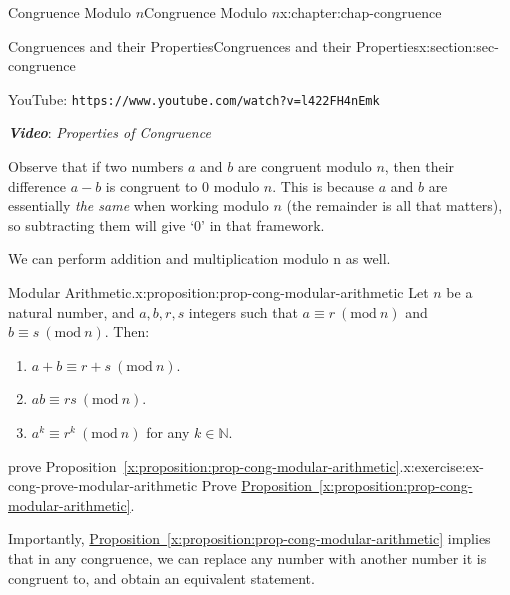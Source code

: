 \documentclass[oneside,10pt,]{book}
\newcommand{\xreffont}{\relax}
\newcommand{\mono}[1]{\texttt{#1}}
\newcommand{\alert}[1]{\textbf{\textit{#1}}}
\numberwithin{equation}{section}
\newlength{\qrsize}
\newlength{\previewwidth}
\newcommand{\Mod}[1]{\ \left(\mathrm{mod}\ #1\right)}
\begin{document}
\begin{chapterptx}{Congruence Modulo \(n\)}{}{Congruence Modulo \(n\)}{}{}{x:chapter:chap-congruence}
\begin{sectionptx}{Congruences and their Properties}{}{Congruences and their Properties}{}{}{x:section:sec-congruence}
\begin{sidebyside}{1}{0}{0}{0}
\begin{sbspanel}{1}
\begin{tcbraster}[raster columns=2, raster column skip=1pt, raster halign=center, raster force size=false, raster left skip=0pt, raster right skip=0pt]
\begin{tcolorbox}[previewstyle, width=\previewwidth]
\end{tcolorbox}%
\begin{tcolorbox}[qrstyle]%
{\hypersetup{urlcolor=black}}%
\end{tcolorbox}%
\begin{tcolorbox}[captionstyle]%
\small YouTube: \mono{https://www.youtube.com/watch?v=l422FH4nEmk}\end{tcolorbox}%
\end{tcbraster}%
\end{sbspanel}%
\end{sidebyside}%
\par
\alert{Video}: \emph{Properties of Congruence}%
\par
Observe that if two numbers \(a\) and \(b\) are congruent modulo \(n\), then their difference \(a-b\) is congruent to 0 modulo \(n\). This is because \(a\) and \(b\) are essentially \emph{the same} when working modulo \(n\) (the remainder is all that matters), so subtracting them will give `0' in that framework.%
\par
We can perform addition and multiplication modulo \textdollar{}n\textdollar{} as well.%
\begin{proposition}{Modular Arithmetic.}{}{x:proposition:prop-cong-modular-arithmetic}%
Let \(n\) be a natural number, and \(a, b, r, s\) integers such that \(a \equiv r \Mod{n}\) and \(b \equiv s \Mod{n}\). Then:%
\begin{enumerate}[label=(\alph*)]
\item{}\(a + b \equiv r + s \Mod{n}\).%
\item{}\(ab \equiv rs \Mod{n}\).%
\item{}\(a^k \equiv r^k \Mod{n}\) for any \(k \in \mathbb{N}\).%
\end{enumerate}
%
\end{proposition}
\begin{inlineexercise}{prove Proposition~{\xreffont\ref*{x:proposition:prop-cong-modular-arithmetic}}.}{x:exercise:ex-cong-prove-modular-arithmetic}%
Prove \hyperref[x:proposition:prop-cong-modular-arithmetic]{Proposition~{\xreffont\ref{x:proposition:prop-cong-modular-arithmetic}}}.%
\end{inlineexercise}%
Importantly, \hyperref[x:proposition:prop-cong-modular-arithmetic]{Proposition~{\xreffont\ref{x:proposition:prop-cong-modular-arithmetic}}} implies that in any congruence, we can replace any number with another number it is congruent to, and obtain an equivalent statement.%

\end{sectionptx}
\end{chapterptx}
\end{document}
